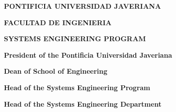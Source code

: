 \thispagestyle{fancy}

\begin{center}
    {\large\bfseries PONTIFICIA UNIVERSIDAD JAVERIANA\par}
    {\large\bfseries FACULTAD DE INGENIERIA\par}
    {\large\bfseries SYSTEMS ENGINEERING PROGRAM\par}
\end{center}

\vspace{4cm}

\begin{center}
    {\large\bfseries President of the Pontificia Universidad Javeriana\par}
    \vspace{0.5cm}
    {\par}

    \vspace{2cm}

    {\large\bfseries Dean of School of Engineering\par}
    \vspace{0.5cm}
    {\par}

    \vspace{2cm}

    {\large\bfseries Head of the Systems Engineering Program\par}
    \vspace{0.5cm}
    {\par}

    \vspace{2cm}

    {\large\bfseries Head of the Systems Engineering Department\par}
    \vspace{0.5cm}
    {\par}
\end{center}
